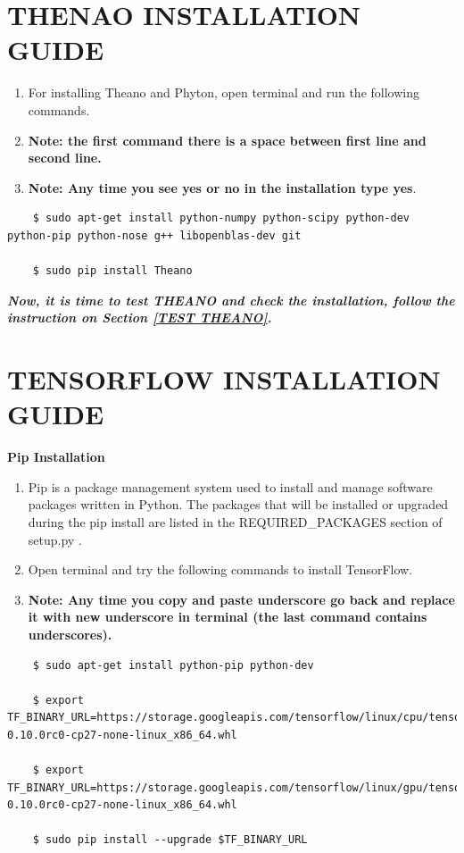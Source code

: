 \documentclass[12pt]{article}
\begin{document}
\newpage
\section{THENAO INSTALLATION GUIDE}

\begin{enumerate}
    \item For installing Theano and Phyton, open terminal and run the following commands.
    \item \textbf{Note: the first command there is a space between first line and second line.}
    \item \textbf{Note: Any time you see yes or no in the installation type yes}.
\end{enumerate}

\begin{lstlisting}
    $ sudo apt-get install python-numpy python-scipy python-dev python-pip python-nose g++ libopenblas-dev git

    $ sudo pip install Theano
\end{lstlisting}

\textbf{\emph{Now, it is time to test THEANO and check the installation, follow the instruction on Section \ref{TEST THEANO}.}}

\newpage
\section{TENSORFLOW INSTALLATION GUIDE}

\textbf{Pip Installation}

\begin{enumerate}
  \item Pip is a package management system used to install and manage software packages written in Python. The packages that will be installed or upgraded during the pip install are listed in the REQUIRED\_PACKAGES section of setup.py \cite{TENSORFLOW}.
  \item Open terminal and try the following commands to install TensorFlow.
  \item \textbf{Note: Any time you copy and paste underscore go back and replace it with new underscore in terminal (the last command contains underscores).}
\end{enumerate}


\begin{lstlisting}
    $ sudo apt-get install python-pip python-dev

    $ export TF_BINARY_URL=https://storage.googleapis.com/tensorflow/linux/cpu/tensorflow-0.10.0rc0-cp27-none-linux_x86_64.whl

    $ export TF_BINARY_URL=https://storage.googleapis.com/tensorflow/linux/gpu/tensorflow-0.10.0rc0-cp27-none-linux_x86_64.whl

    $ sudo pip install --upgrade $TF_BINARY_URL
\end{lstlisting}
\end{document}
